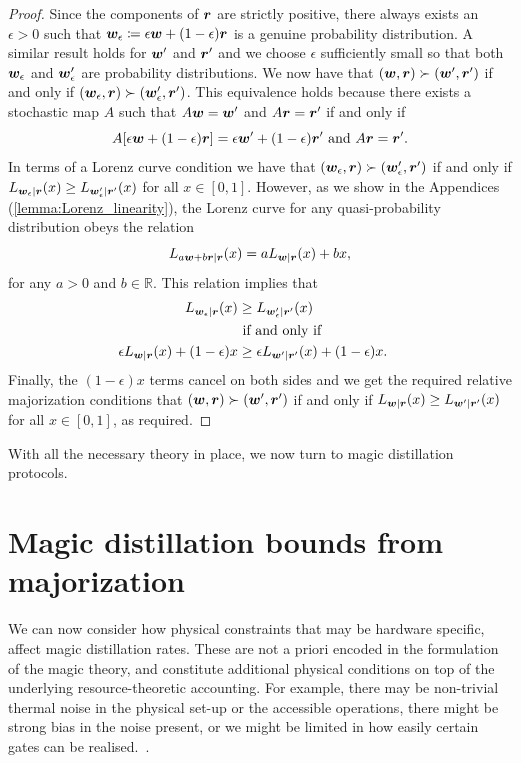 \documentclass[pra,
aps,
twocolumn,
superscriptaddress,
groupedaddress,
nofootinbib,
reprint
]{revtex4-1}
\begin{document}
 \begin{proof}
Since the components of $\boldsymbol{r}$ are strictly positive, there always exists an $\epsilon >0$ such that $\boldsymbol{w}_\epsilon \coloneqq \epsilon \boldsymbol{w} + (1-\epsilon) \boldsymbol{r}$ is a genuine probability distribution. A similar result holds for $\boldsymbol{w}'$ and $\boldsymbol{r}'$ and we choose $\epsilon$ sufficiently small so that both $\boldsymbol{w}_\epsilon$ and $\boldsymbol{w}_\epsilon'$ are probability distributions. We now have that $(\boldsymbol{w} , \boldsymbol{r}) \succ (\boldsymbol{w}', \boldsymbol{r}')$ if and only if $(\boldsymbol{w}_\epsilon , \boldsymbol{r}) \succ (\boldsymbol{w}_\epsilon', \boldsymbol{r}')$. This equivalence holds because there exists a stochastic map $A$ such that $A \boldsymbol{w} = \boldsymbol{w}'$ and $A \boldsymbol{r} = \boldsymbol{r}'$ if and only if 
\begin{equation}
A[\epsilon \boldsymbol{w} + (1-\epsilon) \boldsymbol{r}] = \epsilon \boldsymbol{w}' + (1-\epsilon) \boldsymbol{r}'\mbox{ and } A\boldsymbol{r} = \boldsymbol{r}'.
\end{equation}
In terms of a Lorenz curve condition we have that $(\boldsymbol{w}_\epsilon , \boldsymbol{r}) \succ (\boldsymbol{w}_\epsilon', \boldsymbol{r}')$ if and only if $L_{\boldsymbol{w}_\epsilon |\boldsymbol{r}} (x) \ge L_{\boldsymbol{w}'_\epsilon |\boldsymbol{r}'} (x)$ for all $x \in [0,1]$. 
However, as we show in the Appendices (\cref{lemma:Lorenz_linearity}), the Lorenz curve for any quasi-probability distribution obeys the relation
\begin{equation}
L_{a \boldsymbol{w} + b \boldsymbol{r} | \boldsymbol{r}} (x) = a L_{\boldsymbol{w}|\boldsymbol{r}} (x) + bx,
\end{equation}
for any $a >0$ and $b \in \mathbb{R}$. This relation implies that
\begin{align}
L_{\boldsymbol{w}_\epsilon |\boldsymbol{r}} (x) &\ge L_{\boldsymbol{w}'_\epsilon |\boldsymbol{r}'} (x) \nonumber \\ 
&\mbox{ if and only if }& \nonumber \\
\epsilon L_{\boldsymbol{w} |\boldsymbol{r}} (x) + (1-\epsilon) x &\ge \epsilon L_{\boldsymbol{w}' |\boldsymbol{r}'} (x) + (1-\epsilon) x.
\end{align}
Finally, the $(1-\epsilon)x$ terms cancel on both sides and we get the required relative majorization conditions that $(\boldsymbol{w}, \boldsymbol{r}) \succ (\boldsymbol{w}', \boldsymbol{r}')$ if and only if $L_{\boldsymbol{w} | \boldsymbol{r}} (x) \ge L_{\boldsymbol{w}' | \boldsymbol{r}'}(x)$ for all $x \in [0,1]$, as required.
\end{proof}

With all the necessary theory in place, we now turn to magic distillation protocols.

\newpage
\section{Magic distillation bounds from majorization}
\label{sec:frag}

We can now consider how physical constraints that may be hardware specific, affect magic distillation rates. These are not a priori encoded in the formulation of the magic theory, and constitute additional physical conditions on top of the underlying resource-theoretic accounting. For example, there may be non-trivial thermal noise in the physical set-up or the accessible operations, there might be strong bias in the noise present, or we might be limited in how easily certain gates can be realised.~\cite{Aliferis_2008, Stephens_2013, Li_2015, Babbush_2018, Tuckett_2019, Guillaud_2019, Fowler_2019}.
\end{document}

